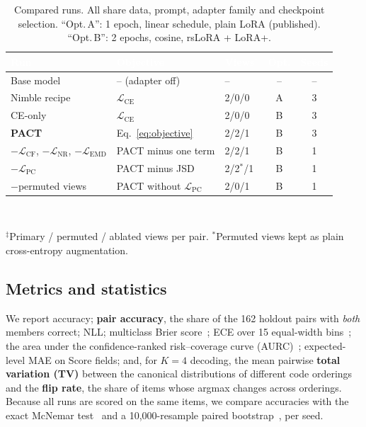 \documentclass[conference]{IEEEtran}
\newcommand{\hd}[1]{\textcolor{white}{\textbf{#1}}}
\newcommand{\Lce}{\mathcal{L}_{\mathrm{CE}}}
\newcommand{\Lcf}{\mathcal{L}_{\mathrm{CF}}}
\newcommand{\Lpc}{\mathcal{L}_{\mathrm{PC}}}
\newcommand{\Lnr}{\mathcal{L}_{\mathrm{NR}}}
\newcommand{\Lemd}{\mathcal{L}_{\mathrm{EMD}}}
\begin{document}
\begin{table}[t]
\centering
\caption{Compared runs. All share data, prompt, adapter family and
checkpoint selection. ``Opt.\,A'': 1 epoch, linear schedule, plain LoRA
(published). ``Opt.\,B'': 2 epochs, cosine, rsLoRA + LoRA+.}
\label{tab:runs}
\setlength{\tabcolsep}{3pt}
\footnotesize
{}
\begin{tabular}{l l l c c}
\toprule
\rowcolor{hdr}
\hd{Run} & \hd{Objective} & \hd{Views$^{\ddagger}$} & \hd{Opt.} & \hd{Seeds} \\
\midrule
Base model & -- (adapter off) & -- & -- & -- \\
Nimble recipe & $\Lce$ & 2/0/0 & A & 3 \\
CE-only & $\Lce$ & 2/0/0 & B & 3 \\
\rowcolor{pactrow}\textbf{PACT} & Eq.~\eqref{eq:objective} & 2/2/1 & B & 3 \\
$-\Lcf$, $-\Lnr$, $-\Lemd$ & PACT minus one term & 2/2/1 & B & 1 \\
$-\Lpc$ & PACT minus JSD & 2/2$^{\ast}$/1 & B & 1 \\
$-$permuted views & PACT without $\Lpc$ & 2/0/1 & B & 1 \\
\bottomrule
\end{tabular}\\[2pt]
{\scriptsize\raggedright $^{\ddagger}$Primary / permuted / ablated views per pair.
$^{\ast}$Permuted views kept as plain cross-entropy augmentation.\par}
\end{table}

\subsection{Metrics and statistics}
We report accuracy; \textbf{pair accuracy}, the share of the 162 holdout pairs
with \emph{both} members correct; NLL; multiclass Brier
score~\cite{brier1950verification}; ECE over 15 equal-width
bins~\cite{naeini2015ece}; the area under the confidence-ranked risk--coverage
curve (AURC)~\cite{geifman2017selective}; expected-level MAE on Score fields;
and, for $K{=}4$ decoding, the mean pairwise \textbf{total variation (TV)}
between the canonical distributions of different code orderings and the
\textbf{flip rate}, the share of items whose argmax changes across orderings.
Because all runs are scored on the same items, we compare accuracies with the
exact McNemar test~\cite{mcnemar1947} and a 10{,}000-resample paired
bootstrap~\cite{efron1993bootstrap}, per seed.
\end{document}
